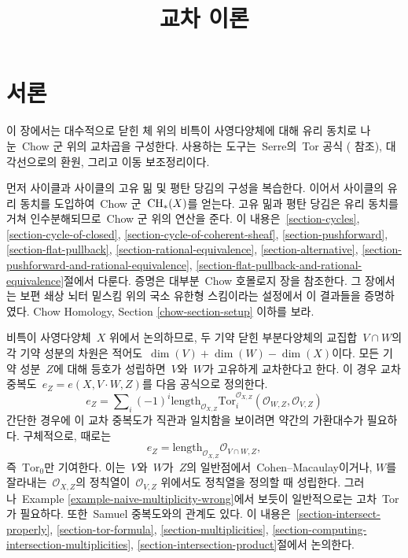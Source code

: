 

%


\title{교차 이론}


\maketitle

\label{section-phantom}

\tableofcontents


\section{서론}
\label{section-introduction}

\noindent
이 장에서는 대수적으로 닫힌 체 위의 비특이 사영다양체에 대해 유리 동치로
나눈\  Chow 군 위의 교차곱을 구성한다. 사용하는 도구는\  Serre의\  Tor 공식
(\cite[Chapter V]{Serre_algebre_locale} 참조), 대각선으로의 환원, 그리고
이동 보조정리이다.

\medskip\noindent
먼저 사이클과 사이클의 고유 밂 및 평탄 당김의 구성을 복습한다. 이어서
사이클의 유리 동치를 도입하여\  Chow 군\  $\mathop{\mathrm{CH}}\nolimits_*(X)$를 얻는다. 고유 밂과
평탄 당김은 유리 동치를 거쳐 인수분해되므로\  Chow 군 위의 연산을 준다.
이 내용은\ 
\ref{section-cycles},
\ref{section-cycle-of-closed},
\ref{section-cycle-of-coherent-sheaf},
\ref{section-pushforward},
\ref{section-flat-pullback},
\ref{section-rational-equivalence},
\ref{section-alternative},
\ref{section-pushforward-and-rational-equivalence},
\ref{section-flat-pullback-and-rational-equivalence}절에서 다룬다.
증명은 대부분\  Chow 호몰로지 장을 참조한다. 그 장에서는 보편 쇄상 뇌터
밑스킴 위의 국소 유한형 스킴이라는 설정에서 이 결과들을 증명하였다.
Chow Homology, Section \ref{chow-section-setup} 이하를 보라.

\medskip\noindent
비특이 사영다양체\  $X$ 위에서 논의하므로, 두 기약 닫힌 부분다양체의 교집합\ 
$V \cap W$의 각 기약 성분의 차원은 적어도\ 
$\dim(V) + \dim(W) - \dim(X)$이다. 모든 기약 성분\  $Z$에 대해 등호가
성립하면\  $V$와\  $W$가 고유하게 교차한다고 한다. 이 경우 교차 중복도\ 
$e_Z = e(X, V \cdot W, Z)$를 다음 공식으로 정의한다.
$$
e_Z = \sum\nolimits_i
(-1)^i
\text{length}_{\mathcal{O}_{X, Z}}
\text{Tor}_i^{\mathcal{O}_{X, Z}}(\mathcal{O}_{W, Z}, \mathcal{O}_{V, Z})
$$
간단한 경우에 이 교차 중복도가 직관과 일치함을 보이려면 약간의 가환대수가
필요하다. 구체적으로, 때로는
$$
e_Z = \text{length}_{\mathcal{O}_{X, Z}} \mathcal{O}_{V \cap W, Z},
$$
즉\  $\text{Tor}_0$만 기여한다. 이는\  $V$와\  $W$가\  $Z$의 일반점에서\ 
Cohen--Macaulay이거나, $W$를 잘라내는\  $\mathcal{O}_{X, Z}$의 정칙열이\ 
$\mathcal{O}_{V, Z}$ 위에서도 정칙열을 정의할 때 성립한다. 그러나\ 
Example \ref{example-naive-multiplicity-wrong}에서 보듯이 일반적으로는
고차\  Tor가 필요하다. 또한\  Samuel 중복도와의 관계도 있다. 이 내용은\ 
\ref{section-intersect-properly},
\ref{section-tor-formula},
\ref{section-multiplicities},
\ref{section-computing-intersection-multiplicities},
\ref{section-intersection-product}절에서 논의한다.

